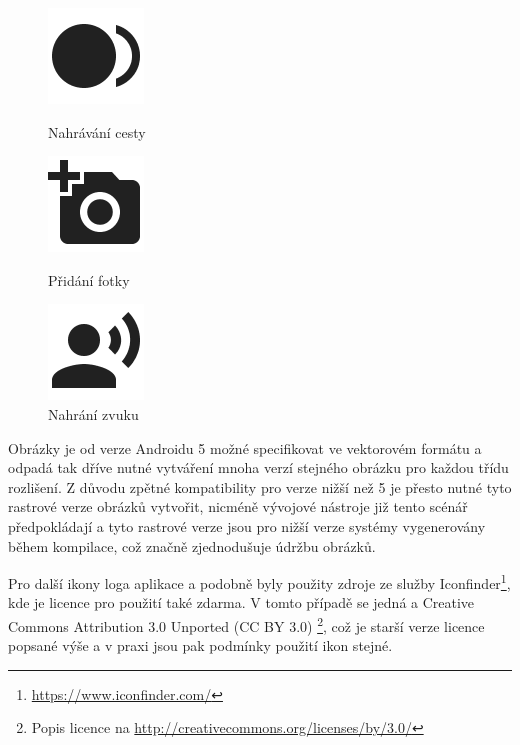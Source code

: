 \documentclass[czech,master,public,dept460,male,java,cpdeclaration]{diploma}
\begin{document}
\begin{figure}[H]
  \centering
  \includegraphics[scale=0.2]{img/record.png}
  \caption{Nahrávání cesty}\label{fig:record}
\endminipage\hfill
{}
  \centering
  \includegraphics[scale=0.2]{img/camera.png}
  \caption{Přidání fotky}\label{fig:camera}
\endminipage\hfill
{}%
  \centering
  \includegraphics[scale=0.2]{img/recordsound.png}
  \caption{Nahrání zvuku}\label{fig:recordsound}
\endminipage
\end{figure}

Obrázky je od verze Androidu 5 možné specifikovat ve vektorovém formátu a odpadá tak dříve
nutné vytváření mnoha verzí stejného obrázku pro každou třídu rozlišení.
Z důvodu zpětné kompatibility pro verze nižší než 5 je přesto nutné tyto rastrové verze obrázků
vytvořit, nicméně vývojové nástroje již tento scénář předpokládají a tyto rastrové verze jsou
pro nižší verze systémy vygenerovány během kompilace, což značně zjednodušuje údržbu obrázků.



Pro další ikony loga aplikace a podobně byly použity zdroje ze služby
Iconfinder\footnote{\url{https://www.iconfinder.com/}}, kde je licence pro použití také zdarma. V tomto
případě se jedná a Creative Commons Attribution 3.0 Unported (CC BY 3.0)
\footnote{Popis licence na \url{http://creativecommons.org/licenses/by/3.0/}}, což je starší verze
licence popsané výše a v praxi jsou pak podmínky použití ikon stejné.





\end{document}

